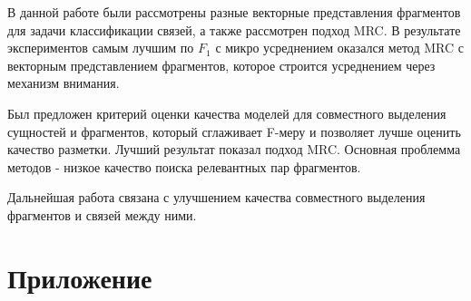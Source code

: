 \documentclass[12pt]{article}
\begin{document}
В данной работе были рассмотрены разные векторные представления фрагментов для задачи классификации связей, а также рассмотрен подход MRC. В результате экспериментов самым лучшим по $F_1$ с микро усреднением оказался метод MRC с векторным представлением фрагментов, которое строится усреднением через механизм внимания.

Был предложен критерий оценки качества моделей для совместного выделения сущностей и фрагментов, который сглаживает F-меру и позволяет лучше оценить качество разметки. Лучший результат показал подход MRC.
Основная проблемма методов - низкое качество поиска релевантных пар фрагментов.

Дальнейшая работа связана с улучшением качества совместного выделения фрагментов и связей между ними. \cite{abaho2021detect}
\clearpage




\clearpage
\section{Приложение}
\end{document}
